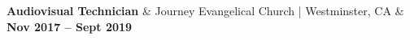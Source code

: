 \textbf{Audiovisual Technician} & 
Journey Evangelical Church | Westminster, CA & 
\textbf{Nov 2017 -- Sept 2019}